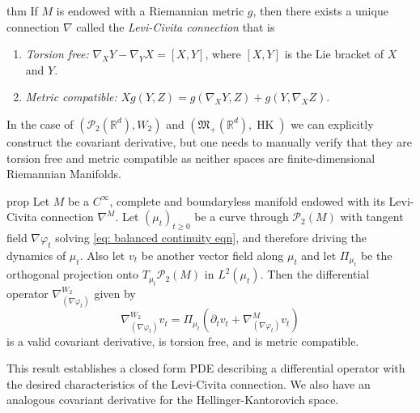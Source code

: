 \documentclass[11pt]{article}
\newcommand{\man}{M}
\newcommand{\posm}{\mathfrak{M}_+(\mathbb{R}^d)}
\newcommand{\HK}{\operatorname{HK}}
\begin{document}
\begin{restatable}{thm}{}
    If $\man$ is endowed with a Riemannian metric $g$, then there exists a unique connection $\nabla$ called the \textit{Levi-Civita connection} that is
    \begin{enumerate}
        \item \textit{Torsion free:} $\nabla_XY - \nabla_YX = [X,Y]$, where $[X,Y]$ is the Lie bracket of $X$ and $Y$. 
        \item \textit{Metric compatible:} $Xg(Y, Z) = g(\nabla_XY, Z) + g(Y, \nabla_XZ).$ 
    \end{enumerate}
\end{restatable}
In the case of $(\mathcal{P}_2(\mathbb{R}^d), W_2)$ and $(\posm, \HK)$ we can explicitly construct the covariant derivative, but one needs to manually verify that they are torsion free and metric compatible as neither spaces are finite-dimensional Riemannian Manifolds.


\begin{restatable}{prop}{} \label{Wasserstein covariant deriv}
    Let $\man$ be a $C^\infty$, complete and boundaryless manifold endowed with its Levi-Civita connection $\nabla^\man$. Let $(\mu_t)_{t\geq 0}$ be a curve through $\mathcal{P}_2(\man)$ with tangent field $\nabla \varphi_t$ solving \cref{eq: balanced continuity eqn}, and therefore driving the dynamics of $\mu_t$. Also let $v_t$ be another vector field along $\mu_t$ and let $\Pi_{\mu_t}$ be the orthogonal projection onto $T_{\mu_t}\mathcal{P}_2(\man)$ in $L^2(\mu_t)$. Then the differential operator $\nabla_{(\nabla\varphi_t)}^{W_2}$ given by
    \begin{equation*}
        \nabla_{(\nabla\varphi_t)}^{W_2}v_t = \Pi_{\mu_t}\left(\partial_t v_t + \nabla^{\man}_{( \nabla \varphi_t)} v_t \right)
    \end{equation*}
    is a valid covariant derivative, is torsion free, and is metric compatible.
\end{restatable}
This result establishes a closed form PDE describing a differential operator with the desired characteristics of the Levi-Civita connection. We also have an analogous covariant derivative for the Hellinger-Kantorovich space.
\end{document}
